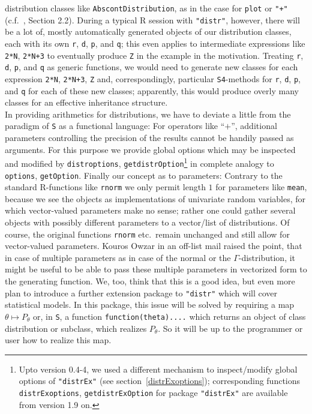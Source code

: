 \documentclass[11pt]{article}
\newcommand{\code}[1]{{\tt #1}}
\newcommand{\pkg}[1]{{\tt "#1"}}
\begin{document}
distribution classes like  \code{AbscontDistribution}, as in the case for 
\code{plot} or \code{"+"} (c.f.\ \cite{K:R:S:04}, Section 2.2). 
During a typical {\sf R} session with \pkg{distr}, however, there will be a lot 
of, mostly automatically generated objects of our distribution classes, each 
with its own \code{r}, \code{d}, \code{p}, and \code{q}; this even applies to 
intermediate expressions like \code{2*N}, \code{2*N+3} to eventually produce 
\code{Z} in the example in the motivation. Treating \code{r}, \code{d}, 
\code{p}, and \code{q} as generic functions, we would need to generate new 
classes for each expression \code{2*N}, \code{2*N+3}, \code{Z} and, 
correspondingly, particular {\tt S4}-methods for \code{r}, \code{d}, \code{p}, 
and \code{q} for each of these new classes; apparently, this would produce 
overly many classes for an effective inheritance structure. \\
In providing arithmetics for distributions, we have to deviate a little from
the paradigm of {\tt S} as a functional language: For operators like ``$+$'',
additional parameters controlling the precision of the results cannot be handily
passed as arguments. For this purpose we provide global options which may be
inspected and modified by \code{distroptions}, 
\code{getdistrOption}\footnote{Upto version 0.4-4, we used a different mechanism 
to inspect/modify global options of \pkg{distrEx} (see 
section~\ref{distrExoptions}); corresponding functions \code{distrExoptions}, 
\code{getdistrExOption} for package \pkg{distrEx} are available from version 
1.9 on.} in complete analogy to \code{options}, \code{getOption}.
%
Finally our concept as to parameters: Contrary to the standard {\sf R}-functions 
like \code{rnorm} we only permit length $1$ for parameters like \code{mean}, 
because we see the objects as implementations of univariate random variables, 
for which vector-valued parameters make no sense; rather one could gather 
several objects with possibly different parameters to a vector/list of 
distributions. Of course, the original functions \code{rnorm} etc.\ remain 
unchanged and still allow for vector-valued parameters.
Kouros Owzar  in an off-list mail raised the point, that in case of multiple 
parameters as in case of the normal or the $\Gamma$-distribution, it might be 
useful to be able to pass these multiple parameters in vectorized form to the 
generating function. We, too, think that this is a good idea, but even more plan 
to introduce a further extension package to \pkg{distr} which will cover 
statistical models. In this package, this issue will be solved by requiring a 
map $\theta \mapsto P_\theta$ or, in {\tt S}, a function 
\code{function(theta){....}} which returns an object of class distribution 
or subclass, which realizes $P_\theta$. So it will be up to the programmer or 
user how to realize this map.
\end{document}
